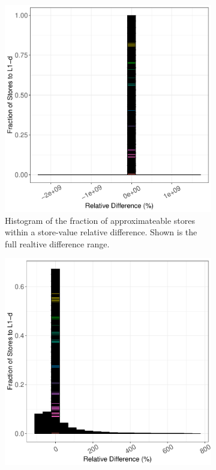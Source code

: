 \begin{figure}[htbp]
	\begin{subfigure}{0.33\textwidth}
		\centering
		\includegraphics[scale=0.4]{graphs/histogram/full_hist.pdf}
		\caption{Histogram of the fraction of approximateable stores within a store-value relative difference. Shown is the full realtive difference range.}
	\end{subfigure}
	\begin{subfigure}{0.33\textwidth}
		\centering
		\includegraphics[scale=0.4]{graphs/histogram/narrow_hist.pdf}

\end{subfigure}
\end{figure}
